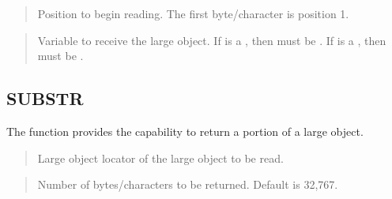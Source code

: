 \documentclass[letterpaper,10pt,english,openany,oneside]{sphinxmanual}
\begin{document}
\begin{quote}

Position to begin reading. The first byte/character is position 1.
\end{quote}

\begin{quote}

Variable to receive the large object. If  is a , then
 must be . If  is a , then  must be
.
\end{quote}

\newpage

\ignorespaces 

\subsection{SUBSTR}
\label{\detokenize{substr::doc}}\label{\detokenize{substr:index-0}}\label{\detokenize{substr:substr}}
The  function provides the capability to return a portion of a
large object.
\begin{quote}

\begin{quote}

\end{quote}
\end{quote}


\begin{quote}

Large object locator of the large object to be read.
\end{quote}

\begin{quote}

Number of bytes/characters to be returned. Default is 32,767.
\end{quote}
\end{document}

